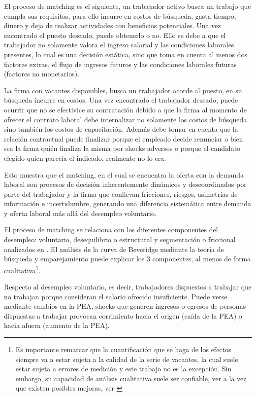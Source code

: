 El proceso de matching es el siguiente, un trabajador activo busca un trabajo que cumpla sus requisitos, para ello incurre en costos de búsqueda, gasta tiempo, dinero y deja de realizar actividades con beneficios potenciales. Una vez encontrado el puesto deseado, puede obtenerlo o no. Ello se debe a que el trabajador no solamente valora el ingreso salarial y las condiciones laborales presentes, lo cual es una decisión estática, sino que toma en cuenta al menos dos factores extras, el flujo de ingresos futuros y las condiciones laborales futuras (factores no monetarios).

La firma con vacantes disponibles, busca un trabajador acorde al puesto, en su búsqueda incurre en costos. Una vez encontrado el trabajador deseado, puede ocurrir que no se efectivice su contratación debido a que la firma al momento de ofrecer el contrato laboral debe internalizar no solamente los costos de búsqueda sino también los costos de capacitación. Además debe tomar en cuenta que la relación contractual puede finalizar porque el empleado decide renunciar o bien sea la firma quién finaliza la misma por shocks adversos o porque el candidato elegido quien parecía el indicado, realmente no lo era.

Esto muestra que el matching, en el cual se encuentra la oferta con la demanda laboral son procesos de decisión inherentemente dinámicos y descoordinados por parte del trabajador y la firma que conllevan fricciones, riesgos, asimetrías de información e incertidumbre, generando una diferencia sistemática entre demanda y oferta laboral más allá del desempleo voluntario.

El proceso de matching se relaciona con los diferentes componentes del desempleo: voluntario, desequilibrio o estructural y segmentación o friccional analizados en \cite{Rama1988}. 
El análisis de la curva de Beveridge mediante la teoría de búsqueda y emparejamiento puede explicar los 3 componentes, al menos de forma cualitativa\footnote{Es importante remarcar que la cuantificación que se haga de los efectos siempre va a estar sujeta a la calidad de la serie de vacantes, la cual suele estar sujeta a errores de medición y este trabajo no es la excepción. Sin embargo, su capacidad de análisis cualitativa suele ser confiable, ver \cite{Dicks-Mireaux1958} a la vez que existen posibles mejoras, ver \cite{Abraham1987}}.

Respecto al desempleo voluntario, es decir, trabajadores dispuestos a trabajar que no trabajan porque consideran el salario ofrecido insuficiente. Puede verse mediante cambios en la PEA, shocks que generen ingresos o egresos de personas dispuestas a trabajar provocan corrimiento hacia el origen (caída de la PEA) o hacia afuera (aumento de la PEA). 

